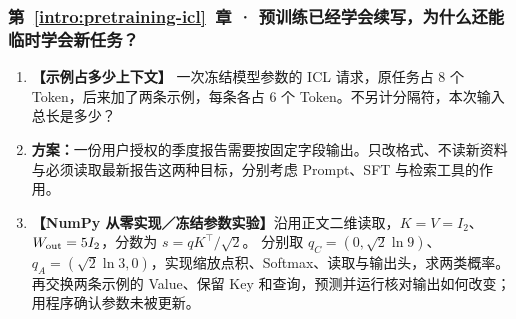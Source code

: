 \subsubsection*{第~\ref*{intro:pretraining-icl}~章 · 预训练已经学会续写，为什么还能临时学会新任务？}
\begin{enumerate}[label={},leftmargin=4.8em,itemsep=4pt]
\item[\textbf{C-093.}] \leavevmode{}\label{exercise:C-093}\label{exercise:icl-context-budget}\textbf{【示例占多少上下文】} 一次冻结模型参数的 ICL 请求，原任务占 $8$ 个 Token，后来加了两条示例，每条各占 $6$ 个 Token。不另计分隔符，本次输入总长是多少？
\item[\textbf{C-094.}] \leavevmode{}\label{exercise:C-094}\label{exercise:prompt-or-training}\textbf{方案：}一份用户授权的季度报告需要按固定字段输出。只改格式、不读新资料与必须读取最新报告这两种目标，分别考虑 Prompt、SFT 与检索工具的作用。
\item[\textbf{C-095.}] \leavevmode{}\label{exercise:C-095}\label{exercise:icl-query-transfer}\textbf{【NumPy 从零实现／冻结参数实验】}沿用正文二维读取，$K=V=I_2$、$W_{\rm out}=5I_2$，分数为 $s=qK^\top/\sqrt2$。
分别取 $q_C=(0,\sqrt2\ln9)$、$q_A=(\sqrt2\ln3,0)$，实现缩放点积、Softmax、读取与输出头，求两类概率。
再交换两条示例的 Value、保留 Key 和查询，预测并运行核对输出如何改变；用程序确认参数未被更新。
\end{enumerate}
